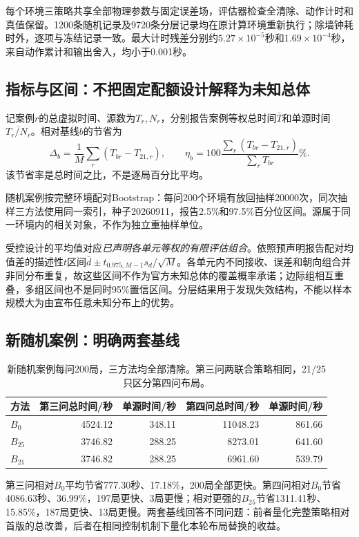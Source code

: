 \documentclass[UTF8,a4paper,zihao=-4,fontset=mac]{ctexart}
\begin{document}
每个环境三策略共享全部物理参数与固定误差场，评估器检查全清除、动作计时和真值保留。1200条随机记录及9720条分层记录均在原计算环境重新执行；除墙钟耗时外，逐项与冻结记录一致。最大计时残差分别约$5.27\times10^{-5}$秒和$1.69\times10^{-4}$秒，来自动作累计和输出舍入，均小于0.001秒。

\subsection{指标与区间：不把固定配额设计解释为未知总体}
记案例$r$的总虚拟时间、源数为$T_r,N_r$，分别报告案例等权总时间$\bar T$和单源时间$\overline{T_r/N_r}$。相对基线$b$的节省为
\begin{equation}\label{eq:saving}
\Delta_b=\frac1M\sum_r(T_{br}-T_{21,r}),\qquad
\eta_b=100\frac{\sum_r(T_{br}-T_{21,r})}{\sum_rT_{br}}\%.
\end{equation}
该节省率是总时间之比，不是逐局百分比平均。

随机案例按完整环境配对Bootstrap\cite{efron}：每问200个环境有放回抽样20000次，同次抽样三方法使用同一索引，种子20260911，报告2.5\%和97.5\%百分位区间。源属于同一环境内的相关对象，不作为独立重抽样单位。

受控设计的平均值对应\emph{已声明各单元等权的有限评估组合}。依照预声明报告配对均值差的描述性$t$区间$\bar d\pm t_{0.975,M-1}s_d/\sqrt M$。各单元内不同接收、误差和朝向组合并非同分布重复，故这些区间不作为官方未知总体的覆盖概率承诺；边际组相互重叠，多组区间也不是同时95\%置信区间。分层结果用于发现失效结构，不能以样本规模大为由宣布任意未知分布上的优势。

\subsection{新随机案例：明确两套基线}
\begin{table}[H]\centering\small
\caption{新随机案例每问200局，三方法均全部清除。第三问两联合策略相同，21/25只区分第四问布局。}\label{tab:iid}
\begin{tabular}{lrrrr}\toprule
方法 & 第三问总时间/秒 & 单源时间/秒 & 第四问总时间/秒 & 单源时间/秒\\\midrule
$B_0$ &4524.12&348.11&11048.23&861.66\\
$B_{25}$ &3746.82&288.25&8273.01&641.60\\
$B_{21}$ &3746.82&288.25&6961.60&539.79\\\bottomrule
\end{tabular}
\end{table}
第三问相对$B_0$平均节省777.30秒、17.18\%，200局全部更快。第四问相对$B_0$节省4086.63秒、36.99\%，197局更快、3局更慢；相对更强的$B_{25}$节省1311.41秒、15.85\%，187局更快、13局更慢。两套基线回答不同问题：前者量化完整策略相对首版的总改善，后者在相同控制机制下量化本轮布局替换的收益。
\end{document}
